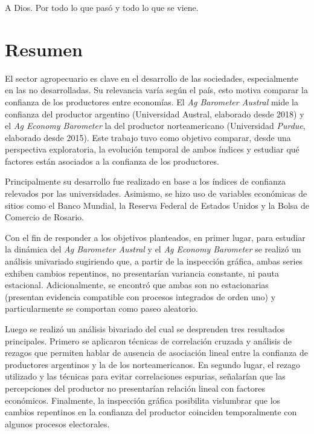 \documentclass[12pt]{article}
\begin{document}
A Dios. Por todo lo que pasó y todo lo que se viene.

\newpage

\section*{Resumen}\label{resumen}

El sector agropecuario es clave en el desarrollo de las sociedades,
especialmente en las no desarrolladas. Su relevancia varía según el
país, esto motiva comparar la confianza de los productores entre
economías. El \emph{Ag Barometer Austral} mide la confianza del
productor argentino (Universidad Austral, elaborado desde 2018) y el
\emph{Ag Economy Barometer} la del productor norteamericano (Universidad
\emph{Purdue}, elaborado desde 2015). Este trabajo tuvo como objetivo
comparar, desde una perspectiva exploratoria, la evolución temporal de
ambos índices y estudiar qué factores están asociados a la confianza de
los productores.

Principalmente su desarrollo fue realizado en base a los índices de
confianza relevados por las universidades. Asimismo, se hizo uso de
variables económicas de sitios como el Banco Mundial, la Reserva Federal
de Estados Unidos y la Bolsa de Comercio de Rosario.

Con el fin de responder a los objetivos planteados, en primer lugar,
para estudiar la dinámica del \emph{Ag Barometer Austral} y el \emph{Ag
Economy Barometer} se realizó un análisis univariado sugiriendo que, a
partir de la inspección gráfica, ambas series exhiben cambios
repentinos, no presentarían variancia constante, ni pauta estacional.
Adicionalmente, se encontró que ambas son no estacionarias (presentan
evidencia compatible con procesos integrados de orden uno) y
particularmente se comportan como paseo aleatorio.

Luego se realizó un análisis bivariado del cual se desprenden tres
resultados principales. Primero se aplicaron técnicas de correlación
cruzada y análisis de rezagos que permiten hablar de ausencia de
asociación lineal entre la confianza de productores argentinos y la de
los norteamericanos. En segundo lugar, el rezago utilizado y las
técnicas para evitar correlaciones espurias, señalarían que las
percepciones del productor no presentarían relación lineal con factores
económicos. Finalmente, la inspección gráfica posibilita vislumbrar que
los cambios repentinos en la confianza del productor coinciden
temporalmente con algunos procesos electorales.
\end{document}
